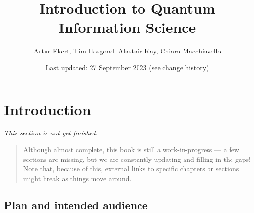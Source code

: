 \documentclass[fleqn,a4paper]{article}
\title{Introduction to Quantum Information Science}
\author{\href{https://www.arturekert.org/}{Artur Ekert}, \href{https://thosgood.com}{Tim Hosgood}, \href{http://www.ma.rhul.ac.uk/akay/}{Alastair Kay}, \href{https://fisica.unipv.it/personale/Persona.php?ID=55}{Chiara Macchiavello}}
\date{Last updated: 27 September 2023 \href{https://github.com/thosgood/qubit.guide/commits/main}{(see change history)}}
\newenvironment{todo}{\color{primary}\emph{This section is not yet finished.}}{}
\let\oldsection\section
\renewcommand\section{\clearpage\oldsection}
\renewcommand{\leq}{\leqslant}
\renewcommand{\geq}{\geqslant}
\theoremstyle{definition}
\theoremstyle{definition}
\theoremstyle{definition}
\theoremstyle{definition}
\theoremstyle{remark}
\begin{document}
\maketitle

\tableofcontents

\providecommand{\xmapsto}[1]{\overset{#1}{\longmapsto}}
\providecommand{\bra}[1]{\langle#1|}
\providecommand{\ket}[1]{|#1\rangle}
\providecommand{\braket}[2]{\langle#1|#2\rangle}
\providecommand{\proj}[1]{|#1\rangle\langle#1|}
\providecommand{\av}[1]{\langle#1\rangle}
\providecommand{\tr}{\operatorname{tr}}
\providecommand{\id}{\mathbf{1}}
\providecommand{\gcd}{\operatorname{gcd}}
\providecommand{\hcf}{\operatorname{hcf}}
\providecommand{\divides}{\mathbin{\vert}}
\providecommand{\diag}[2]{\begin{bmatrix}#1&0\\0&#2\end{bmatrix}}
\providecommand{\smalldiag}[2]{\left(\begin{smallmatrix}#1&0\\0&#2\end{smallmatrix}\right)}
\providecommand{\mqty}[1]{\begin{matrix}#1\end{matrix}}
\providecommand{\bmqty}[1]{\begin{bmatrix}#1\end{bmatrix}}
\renewcommand{\leq}{\leqslant}
\renewcommand{\geq}{\geqslant}
\renewcommand{\mod}[1]{\ \mathrm{mod}\ #1}

\hypertarget{introduction}{%
\section*{Introduction}\label{introduction}}

\begin{todo}

\end{todo}

\begin{quote}
Although almost complete, this book is still a work-in-progress --- a few sections are missing, but we are constantly updating and filling in the gaps!
Note that, because of this, external links to specific chapters or sections might break as things move around.
\end{quote}

\hypertarget{plan-and-intended-audience}{%
\subsection*{Plan and intended audience}\label{plan-and-intended-audience}}
\end{document}
